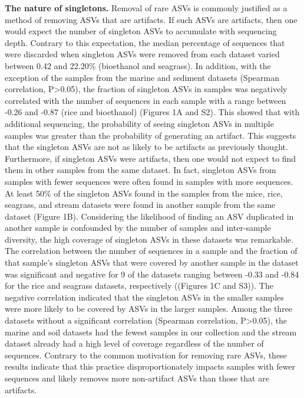 \documentclass[
]{article}
\begin{document}
\textbf{The nature of singletons.} Removal of rare ASVs is commonly
justified as a method of removing ASVs that are artifacts. If such ASVs
are artifacts, then one would expect the number of singleton ASVs to
accumulate with sequencing depth. Contrary to this expectation, the
median percentage of sequences that were discarded when singleton ASVs
were removed from each dataset varied between 0.42 and 22.20\%
(bioethanol and seagrass). In addition, with the exception of the
samples from the marine and sediment datasets (Spearman correlation,
P\textgreater0.05), the fraction of singleton ASVs in samples was
negatively correlated with the number of sequences in each sample with a
range between -0.26 and -0.87 (rice and bioethanol) (Figures 1A and S2).
This showed that with additional sequencing, the probability of seeing
singleton ASVs in multiple samples was greater than the probability of
generating an artifact. This suggests that the singleton ASVs are not as
likely to be artifacts as previously thought. Furthermore, if singleton
ASVs were artifacts, then one would not expect to find them in other
samples from the same dataset. In fact, singleton ASVs from samples with
fewer sequences were often found in samples with more sequences. At
least 50\% of the singleton ASVs found in the samples from the mice,
rice, seagrass, and stream datasets were found in another sample from
the same dataset (Figure 1B). Considering the likelihood of finding an
ASV duplicated in another sample is confounded by the number of samples
and inter-sample diversity, the high coverage of singleton ASVs in these
datasets was remarkable. The correlation between the number of sequences
in a sample and the fraction of that sample's singleton ASVs that were
covered by another sample in the dataset was significant and negative
for 9 of the datasets ranging between -0.33 and -0.84 for the rice and
seagrass datasets, respectively ((Figures 1C and S3)). The negative
correlation indicated that the singleton ASVs in the smaller samples
were more likely to be covered by ASVs in the larger samples. Among the
three datasets without a significant correlation (Spearman correlation,
P\textgreater0.05), the marine and soil datasets had the fewest samples
in our collection and the stream dataset already had a high level of
coverage regardless of the number of sequences. Contrary to the common
motivation for removing rare ASVs, these results indicate that this
practice disproportionately impacts samples with fewer sequences and
likely removes more non-artifact ASVs than those that are artifacts.
\end{document}
